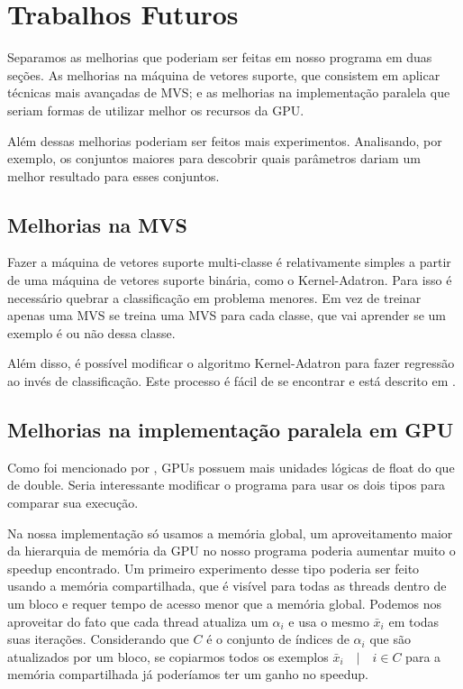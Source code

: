 \section{Trabalhos Futuros}

Separamos as melhorias que poderiam ser feitas em nosso programa em duas seções. As melhorias na máquina de vetores suporte, que consistem em aplicar técnicas mais avançadas de MVS; %
e as melhorias na implementação paralela que seriam formas de utilizar melhor os recursos da GPU.

Além dessas melhorias poderiam ser feitos mais experimentos. Analisando, por exemplo, os conjuntos maiores para descobrir quais parâmetros dariam um melhor resultado para esses conjuntos.


\subsection{Melhorias na MVS}

Fazer a máquina de vetores suporte multi-classe é relativamente simples a partir de uma máquina de vetores suporte binária, como o Kernel-Adatron. Para isso é necessário quebrar a classificação em problema menores. Em vez de treinar apenas uma MVS se treina uma MVS para cada classe, que vai aprender se um exemplo é ou não dessa classe.

Além disso, é possível modificar o algoritmo Kernel-Adatron para fazer regressão ao invés de classificação. Este processo é fácil de se encontrar e está descrito em \cite{art:LIVRO_KAA}.

\subsection{Melhorias na implementação paralela em GPU} \label{sec:melhoriasCuda}

Como foi mencionado por \cite{art:REF_ART_2}, GPUs possuem mais unidades lógicas de float do que de double. Seria interessante modificar o programa para usar os dois tipos para comparar sua execução.

Na nossa implementação só usamos a memória global, um aproveitamento maior da hierarquia de memória da GPU no nosso programa poderia aumentar muito o speedup encontrado. Um primeiro experimento desse tipo poderia ser feito usando a memória compartilhada, que é visível para todas as threads dentro de um bloco e requer tempo de acesso menor que a memória global. Podemos nos aproveitar do fato que cada thread atualiza um $\alpha_i$ e usa o mesmo $\bar{x}_i$ em todas suas iterações. Considerando que $C$ é o conjunto de índices de $\alpha_i$ que são atualizados por um bloco, se copiarmos todos os exemplos $\bar{x}_i\quad|\quad i\in C$ para a memória compartilhada já poderíamos ter um ganho no speedup.

